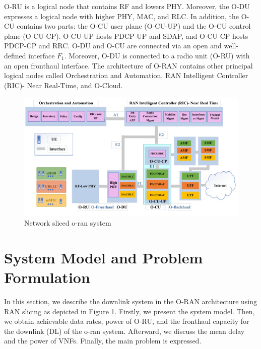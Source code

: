 \documentclass[lettersize,journal]{IEEEtran}
\begin{document}
O-RU is a logical node that contains RF and lowers PHY. Moreover, the O-DU expresses a logical node with higher PHY, MAC, and RLC.
In addition, the O-CU contains two parts: the O-CU user plane (O-CU-UP) and the O-CU control plane (O-CU-CP). O-CU-UP hosts PDCP-UP and SDAP, and O-CU-CP hosts PDCP-CP and RRC.
O-DU and O-CU are connected via an open and well-defined interface $F_1$.
Moreover, O-DU is connected to a radio unit (O-RU) with an open fronthaul interface.
The architecture of O-RAN contains other principal logical nodes called Orchestration and Automation, RAN Intelligent Controller (RIC)- Near Real-Time, and O-Cloud\cite{gavrilovska2020cloud,niknam2020intelligent,kazemifard2021minimum,both2021system,ORANArch,ORANML,lin2021toward}. 
\begin{figure}
  \centering
  \captionsetup{justification=centering}
    \includegraphics[scale = 0.45]{finalDraw.pdf}
  \caption{Network sliced o-ran system}
  \label{fig:c11}
\end{figure}
\section{System Model and Problem Formulation}\label{systemmodel}
In this section, we describe the downlink system in the O-RAN architecture using RAN slicing as depicted in Figure \ref{fig:c11}.
Firstly, we present the system model. Then, we obtain achievable data rates, power of O-RU, and the fronthaul capacity for the downlink (DL) of the o-ran system. Afterward, we discuss the mean delay and the power of VNFs.
Finally, the main problem is expressed.
\end{document}
